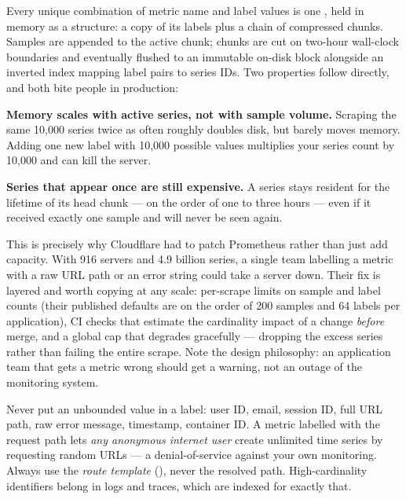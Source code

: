  Every unique combination of metric name and label values is one , held in memory as a  structure: a copy of its labels plus a chain of compressed chunks. Samples are appended to the active chunk; chunks are cut on two-hour wall-clock boundaries and eventually flushed to an immutable on-disk block alongside an inverted index mapping label pairs to series IDs. Two properties follow directly, and both bite people in production:

\begin{wbitem}
  \item \textbf{Memory scales with active series, not with sample volume.} Scraping the same 10{,}000 series twice as often roughly doubles disk, but barely moves memory. Adding one new label with 10{,}000 possible values multiplies your series count by 10{,}000 and can kill the server.
  \item \textbf{Series that appear once are still expensive.} A series stays resident for the lifetime of its head chunk --- on the order of one to three hours --- even if it received exactly one sample and will never be seen again.
\end{wbitem}

\begin{behind}
This is precisely why Cloudflare had to patch Prometheus rather than just add capacity. With 916 servers and 4.9 billion series, a single team labelling a metric with a raw URL path or an error string could take a server down. Their fix is layered and worth copying at any scale: per-scrape limits on sample and label counts (their published defaults are on the order of 200 samples and 64 labels per application), CI checks that estimate the cardinality impact of a change \emph{before} merge, and a global cap that degrades gracefully --- dropping the excess series rather than failing the entire scrape. Note the design philosophy: an application team that gets a metric wrong should get a warning, not an outage of the monitoring system.
\end{behind}

\begin{secwarn}
Never put an unbounded value in a label: user ID, email, session ID, full URL path, raw error message, timestamp, container ID. A metric labelled with the request path lets \emph{any anonymous internet user} create unlimited time series by requesting random URLs --- a denial-of-service against your own monitoring. Always use the \emph{route template} (), never the resolved path. High-cardinality identifiers belong in logs and traces, which are indexed for exactly that.
\end{secwarn}

